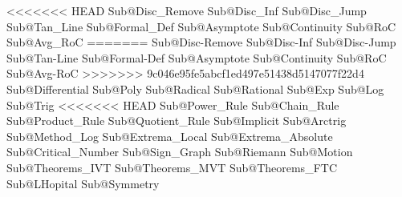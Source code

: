 <<<<<<< HEAD
Sub@Disc_Remove 			%
Sub@Disc_Inf				%
Sub@Disc_Jump				%
Sub@Tan_Line				%
Sub@Formal_Def				%
Sub@Asymptote				%
Sub@Continuity				%
Sub@RoC						%
Sub@Avg_RoC					%
=======
Sub@Disc-Remove 			%
Sub@Disc-Inf				%
Sub@Disc-Jump				%
Sub@Tan-Line				%
Sub@Formal-Def				%
Sub@Asymptote				%
Sub@Continuity				%
Sub@RoC						%
Sub@Avg-RoC					%
>>>>>>> 9c046e95fe5abcf1ed497e51438d5147077f22d4
Sub@Differential			%
Sub@Poly					%
Sub@Radical					%
Sub@Rational				%
Sub@Exp						%
Sub@Log						%
Sub@Trig					%
<<<<<<< HEAD
Sub@Power_Rule				%
Sub@Chain_Rule				%
Sub@Product_Rule			%
Sub@Quotient_Rule			%
Sub@Implicit				%
Sub@Arctrig					%
Sub@Method_Log				%
Sub@Extrema_Local			%
Sub@Extrema_Absolute		%
Sub@Critical_Number			%
Sub@Sign_Graph				%
Sub@Riemann					%
Sub@Motion					%
Sub@Theorems_IVT			%
Sub@Theorems_MVT			%
Sub@Theorems_FTC			%
Sub@LHopital				%
Sub@Symmetry				%
